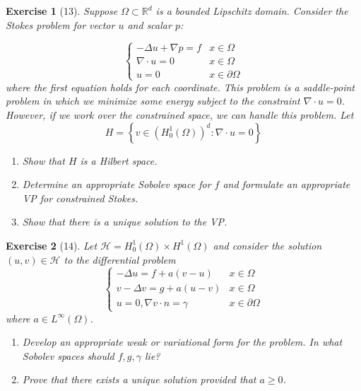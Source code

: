 \documentclass[letterpaper,twoside,11pt]{article}
\theoremstyle{mystyle}
\newtheorem*{exercise}{Exercise}
\newcommand{\R}{{\mathbb R}}
\begin{document}
\begin{exercise}[13]
Suppose $\Omega\subset \R^d$ is a bounded Lipschitz domain. Consider the Stokes problem for vector $u$ and scalar $p$: 

\[\left\{ 
\begin{array}{*{20}{rl}}
- \Delta u + \nabla p = f  & x \in \Omega \\[.2cm] 
\nabla \cdot u = 0 & x \in \Omega \\[.2cm] 
u = 0 & x \in \partial \Omega  
\end{array}
\right. \]
where the first equation holds for each coordinate. This problem is a saddle-point problem in which we minimize some energy subject to the constraint $\nabla \cdot u = 0$. However, if we work over the constrained space, we can handle this problem. Let 
\[H = \left\{ v \in \left( H_0^1 (\Omega) \right)^d  : \nabla \cdot u = 0\right\}\]
\begin{enumerate}
  \item Show that $H$ is a Hilbert space. 
  \item Determine an appropriate Sobolev space for $f$ and formulate an appropriate VP for constrained Stokes. 
  \item Show that there is a unique solution to the VP. 
\end{enumerate}
\end{exercise}


\begin{exercise}[14]
Let $\mathcal H = H_0^1 \left( \Omega \right) \times H^1 \left( \Omega \right)$ and consider the solution $\left( u,v \right)\in \mathcal H$ to the differential problem  
\[\left\{ {\begin{array}{*{20}{c}}
  - \Delta u = f + a\left( v-u \right) & x \in \Omega \\[.2cm] 
  v - \Delta v = g + a(u-v) & x \in \Omega \\[.2cm] 
  u = 0, \nabla v \cdot n = \gamma & x \in \partial \Omega
\end{array}} \right.\]
where $a \in L^\infty \left( \Omega \right)$. 
\begin{enumerate}
  \item Develop an appropriate weak or variational form for the problem. In what Sobolev spaces should $f, g, \gamma$ lie? 
  \item Prove that there exists a unique solution provided that $a \geq 0$. 
\end{enumerate}
\end{exercise}
\end{document}
